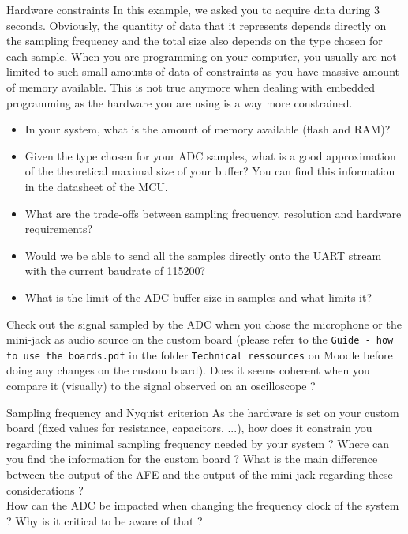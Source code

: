 \begin{bclogo}[couleur = gray!20, arrondi = 0.2, logo=\bcquestion]{Hardware constraints}
In this example, we asked you to acquire data during 3 seconds. Obviously, the quantity of data that it represents depends directly on the sampling frequency and the total size also depends on the type chosen for each sample. When you are programming on your computer, you usually are not limited to such small amounts of data of constraints as you have massive amount of memory available. This is not true anymore when dealing with embedded programming as the hardware you are using is a way more constrained.
\begin{itemize}
    \item In your system, what is the amount of memory available (flash and RAM)?
    \item Given the type chosen for your ADC samples, what is a good approximation of the theoretical maximal size of your buffer? You can find this information in the datasheet of the MCU.
    \item What are the trade-offs between sampling frequency, resolution and hardware requirements?
    \item Would we be able to send all the samples directly onto the UART stream with the current baudrate of 115200?
    \item What is the limit of the ADC buffer size in samples and what limits it?
\end{itemize}

\end{bclogo}

\noindent Check out the signal sampled by the ADC when you chose the microphone or the mini-jack as audio source on the custom board (please refer to the \texttt{Guide - how to use the boards.pdf} in the folder \texttt{Technical ressources} on Moodle before doing any changes on the custom board). Does it seems coherent when you compare it (visually) to the signal observed on an oscilloscope ?

\begin{bclogo}[couleur = gray!20, arrondi = 0.2, logo=\bcquestion]{Sampling frequency and Nyquist criterion}
As the hardware is set on your custom board (fixed values for resistance, capacitors, ...), how does it constrain you regarding the minimal sampling frequency needed by your system ? Where can you find the information for the custom board ? What is the main difference between the output of the AFE and the output of the mini-jack regarding these considerations ? \\

\noindent How can the ADC be impacted when changing the frequency clock of the system ? Why is it critical to be aware of that ?
\end{bclogo}
